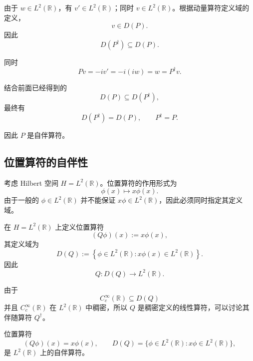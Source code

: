 \documentclass[UTF8,a4paper,11pt,openany]{ctexbook}
\begin{document}
\begin{proofblock}
由于 $w\in L^2(\mathbb R)$，有 $v'\in L^2(\mathbb R)$；同时
$v\in L^2(\mathbb R)$。根据动量算符定义域的定义，
\[
v\in D(P).
\]
因此
\begin{equation}
    D(P^\dagger)\subseteq D(P).
\end{equation}

同时
\[
Pv
=
-iv'
=
-i(iw)
=
w
=
P^\dagger v.
\]

结合前面已经得到的
\[
D(P)\subseteq D(P^\dagger),
\]
最终有
\begin{equation}
    D(P^\dagger)=D(P),
    \qquad
    P^\dagger=P.
\end{equation}

因此 $P$ 是自伴算符。
\end{proofblock}

\subsection{位置算符的自伴性}

考虑 Hilbert 空间 $H=L^2(\mathbb R)$。位置算符的作用形式为
\[
\phi(x)\longmapsto x\phi(x).
\]
由于一般的 $\phi\in L^2(\mathbb R)$ 并不能保证
$x\phi\in L^2(\mathbb R)$，因此必须同时指定其定义域。

\begin{definition}[位置算符]
在 $H=L^2(\mathbb R)$ 上定义位置算符
\begin{equation}
    (Q\phi)(x):=x\phi(x),
\end{equation}
其定义域为
\begin{equation}
    D(Q)
    :=
    \left\{
    \phi\in L^2(\mathbb R):
    x\phi(x)\in L^2(\mathbb R)
    \right\}.
\end{equation}
因此
\[
Q:D(Q)\to L^2(\mathbb R).
\]
\end{definition}

由于
\[
C_c^\infty(\mathbb R)\subseteq D(Q)
\]
并且 $C_c^\infty(\mathbb R)$ 在 $L^2(\mathbb R)$ 中稠密，所以
$Q$ 是稠密定义的线性算符，可以讨论其伴随算符 $Q^\dagger$。

\begin{proposition}
位置算符
\[
(Q\phi)(x)=x\phi(x),
\qquad
D(Q)
=
\{\phi\in L^2(\mathbb R):x\phi\in L^2(\mathbb R)\},
\]
是 $L^2(\mathbb R)$ 上的自伴算符。
\end{proposition}
\end{document}
